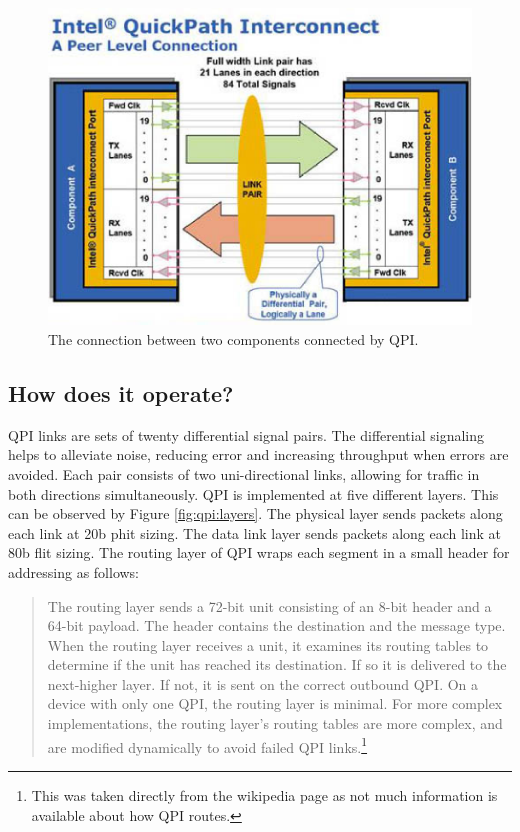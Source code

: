 \documentclass[conference]{IEEEtran}
\begin{document}
\begin{figure}[!t]
	\begin{center}
		\includegraphics[scale=.6]{qpiFabric}
	\end{center}
	\caption{The connection between two components connected by
	QPI.}
	\label{fig:qpi:fabric}
\end{figure}


\subsection{How does it operate?}
QPI links are sets of twenty differential signal pairs. The differential
signaling helps to alleviate noise, reducing error and increasing throughput
when errors are avoided. Each pair consists of two uni-directional links,
allowing for traffic in both directions simultaneously. 
QPI is implemented at five different layers\cite{intelQPIintro}. This can be
observed by Figure \ref{fig:qpi:layers}. The physical layer sends packets along
each link at 20b phit sizing. The data link layer sends packets along each link
at 80b flit sizing. The routing layer of QPI wraps each segment in a small
header for addressing as follows:

\bigskip

\begin{quote}
The routing layer sends a 72-bit unit consisting of an 8-bit
header and a 64-bit payload. The header contains the destination and the message type.
When the routing layer receives a unit, it examines its routing tables to
determine if the unit has reached its destination. If so it is delivered to the
next-higher layer. If not, it is sent on the correct outbound QPI. On a device
with only one QPI, the routing layer is minimal. For more complex
implementations, the routing layer's routing tables are more complex, and are
modified dynamically to avoid failed QPI links.\footnote{This was taken
directly from the wikipedia page as not much information is available about how
QPI routes.}
\end{quote}
\end{document}
